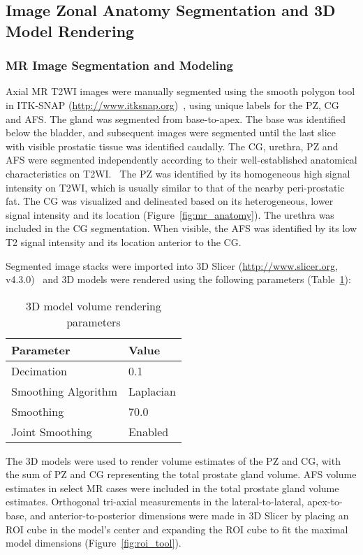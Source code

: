 \subsection{Image Zonal Anatomy Segmentation and 3D Model Rendering}
\subsubsection{MR Image Segmentation and Modeling}
Axial MR T2WI images were manually segmented using the smooth polygon tool in
ITK-SNAP (\url{http://www.itksnap.org})~\cite{Yushkevich2006}, using unique labels for the PZ, CG and AFS. The
gland was segmented from base-to-apex.  The base was identified below the
bladder, and subsequent images were segmented until the last slice with visible
prostatic tissue was identified caudally. The CG, urethra, PZ and AFS were
segmented independently according to their well-established anatomical
characteristics on
T2WI.~\cite{Barentsz2012,Jung2012,Poon1985,Hricak2007,Bonekamp2011} The PZ was
identified by its homogeneous high signal intensity on T2WI, which is usually
similar to that of the nearby peri-prostatic fat. The CG was visualized and
delineated based on its heterogeneous, lower signal intensity and its location
(Figure~\ref{fig:mr_anatomy}). The urethra was included in the CG segmentation.
When visible, the AFS was identified by its low T2 signal intensity and its
location anterior to the CG. 



Segmented image stacks were imported into 3D Slicer (\url{http://www.slicer.org}, v4.3.0)~\cite{Fedorov2012} and 3D
models were rendered using the following parameters (Table~\ref{tab:3dslicer}):

\begin{table}[h!]
\centering
\caption{3D model volume rendering parameters}
\begin{tabular}{ll}
{\bf Parameter} & {\bf Value} \\ \hline
Decimation & 0.1 \\
Smoothing Algorithm & Laplacian \\
Smoothing  & 70.0 \\
Joint Smoothing & Enabled \\
\end{tabular}
\label{tab:3dslicer}
\end{table}

The 3D models were used to render volume estimates of the PZ and CG, with the
sum of PZ and CG representing the total prostate gland volume. AFS volume
estimates in select MR cases were included in the total prostate gland volume
estimates. Orthogonal tri-axial measurements in the lateral-to-lateral,
apex-to-base, and anterior-to-posterior dimensions were made in 3D Slicer by
placing an ROI cube in the model's center and expanding the ROI cube to fit the
maximal model dimensions (Figure~\ref{fig:roi_tool}). 

